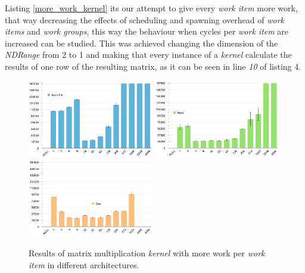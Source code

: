 \par{Listing \ref{more_work_kernel} its our attempt to give every 
    \emph{work item} more work, that way decreasing the effects of scheduling 
    and spawning overhead of \emph{work items} and \emph{work groups},
    this way the behaviour when cycles per \emph{work item} are increased can 
    be studied. This was achieved changing the dimension of the \emph{NDRange} 
    from 2 to 1 and making that every instance of a \emph{kernel} calculate the 
    results of one row of the resulting matrix, as it can be 
    seen in line \emph{10} of listing 4.}

\begin{figure}[!h]
    \centering
    \includegraphics[width=0.49\textwidth]{figures/opt1_phi.png}
    \includegraphics[width=0.49\textwidth]{figures/opt1_cpu.png}
    \includegraphics[width=0.49\textwidth]{figures/opt1_gpu.png}
    \caption{Results of matrix multiplication \emph{kernel} with more work per 
            \emph{work item} in different architectures.}
    \label{MoreWork}
\end{figure}

